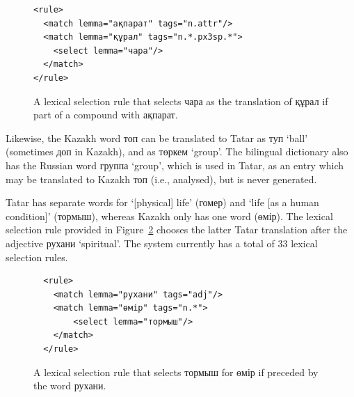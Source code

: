 \documentclass[a4paper,11pt]{article}
\newcommand{\eng}[1]{`#1'}
\begin{document}
\begin{figure}
\vspace{-1em}
\begin{lstlisting}
<rule> 
  <match lemma="ақпарат" tags="n.attr"/> 
  <match lemma="құрал" tags="n.*.px3sp.*">
    <select lemma="чара"/>
  </match> 
</rule>
\end{lstlisting}
\vspace{-1em}
\caption{A lexical selection rule that selects чара as the translation of құрал if part of a compound with ақпарат.}
\label{fig:lrx}
\end{figure}

Likewise, the Kazakh word топ can be translated to Tatar as туп \eng{ball} (sometimes
доп in Kazakh), and as төркем \eng{group}.  The bilingual dictionary also has 
the Russian word группа \eng{group}, which is used in Tatar, as an entry which may be translated 
to Kazakh топ (i.e., analysed), but is never generated.

Tatar has separate words for \eng{[physical] life} (гомер) and \eng{life [as a human condition]} (тормыш), whereas Kazakh only has one word (өмір).  The lexical selection rule provided in Figure~\ref{fig:lrx3} chooses the latter Tatar translation after the adjective рухани \eng{spiritual}.  The system currently has a total of 33 lexical selection rules.




\begin{figure}
\vspace{-1em}
\begin{lstlisting}
  <rule>
    <match lemma="рухани" tags="adj"/>
    <match lemma="өмір" tags="n.*">
        <select lemma="тормыш"/>
    </match>
  </rule>
\end{lstlisting}
\vspace{-1em}
\caption{A lexical selection rule that selects тормыш for өмір if preceded by the word рухани.}
\label{fig:lrx3}
\end{figure}
\end{document}

